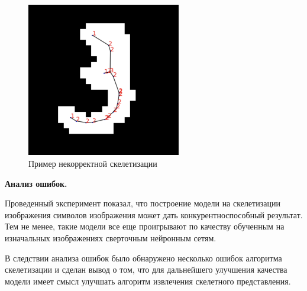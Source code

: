 \documentclass[12pt, twoside]{article}
\begin{document}
\begin{enumerate}
 \begin{figure}[H]
	\begin{center}
 		\includegraphics[width=0.6\textwidth]{bad_sample.jpg}
 	\end{center}
  \caption{Пример некорректной скелетизации}
  \label{fig:bad_sample}
\end{figure}

 \end{enumerate}
 
 \item  \textbf{Анализ ошибок.}
 
Проведенный эксперимент показал, что построение модели на скелетизации изображения символов изображения может дать конкурентноспособный результат. Тем не менее, такие модели все еще проигрывают по качеству обученным на изначальных изображениях сверточным нейронным сетям. 

В следствии анализа ошибок было обнаружено несколько ошибок алгоритма скелетизации и сделан вывод о том, что для дальнейшего улучшения качества модели имеет смысл улучшать алгоритм извлечения скелетного представления.
\end{document}
